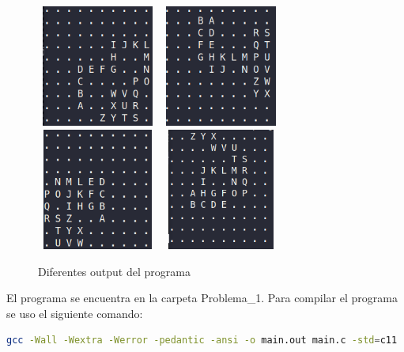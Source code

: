 \begin{figure}[H]
    \centering
    \includegraphics[width=4cm,height=4cm]{Graphics/example_4_1_problem1.png}
    \includegraphics[width=4cm,height=4cm]{Graphics/example_4_2_problem1.png}
    \includegraphics[width=4cm,height=4cm]{Graphics/example_4_3_problem1.png}
    \includegraphics[width=4cm,height=4cm]{Graphics/example_4_4_problem1.png}
    \caption{Diferentes output del programa}
    \label{fig:example_final_problema1}
\end{figure}

El programa se encuentra en la carpeta \textcolor{citecolor}{Problema\_1}. Para compilar el programa se uso el siguiente comando:
\begin{lstlisting}[language=bash]
    gcc -Wall -Wextra -Werror -pedantic -ansi -o main.out main.c -std=c11
\end{lstlisting}
